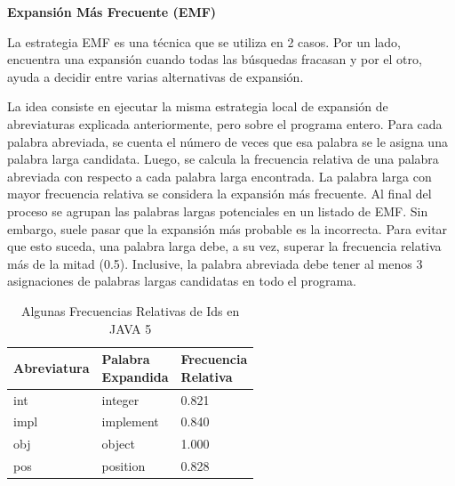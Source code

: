 \noindent \textbf{Expansión Más Frecuente (EMF)\\}


La estrategia EMF \cite{EZH08} es una técnica que se utiliza en 2 casos. Por un lado, 
encuentra una expansión cuando todas las búsquedas fracasan y por el otro, ayuda a decidir entre varias alternativas de expansión. 

La idea consiste en ejecutar la misma estrategia local de expansión de abreviaturas explicada anteriormente, pero sobre el programa entero. Para cada palabra abreviada, se cuenta el número de veces que esa palabra se le asigna una palabra larga candidata. Luego, se calcula la frecuencia relativa de una palabra abreviada con respecto a cada palabra larga encontrada. La palabra larga con mayor frecuencia relativa se considera la expansión más frecuente. Al final del proceso se agrupan las palabras largas potenciales en un listado de EMF.
Sin embargo, suele pasar que la expansión más probable es la incorrecta. Para evitar que esto suceda, una palabra larga debe, a su vez, superar la frecuencia relativa más de la mitad (0.5). Inclusive, la palabra abreviada debe tener al menos 3 asignaciones de palabras largas candidatas en todo el programa.

\begin{table}[b!]
\centering
   \begin{tabular}{| l |l | l |}
     \hline \textbf{Abreviatura} & \shortstack{\textbf{Palabra} \\ \textbf{Expandida}} & \shortstack{\textbf{Frecuencia} \\ \textbf{Relativa}} \\
     \hline int & integer & 0.821 \\
     \hline impl & implement & 0.840 \\
     \hline obj & object & 1.000 \\
     \hline pos & position & 0.828 \\
     \hline	   
   \end{tabular}
   
\caption{Algunas Frecuencias Relativas de Ids en JAVA 5}
\label{tabEmf}
 
\end {table}

